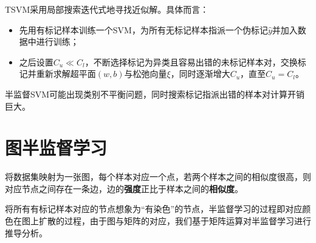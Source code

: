 TSVM采用局部搜索迭代式地寻找近似解。具体而言：
\begin{itemize}
    \item 先用有标记样本训练一个SVM，为所有无标记样本指派一个伪标记$\hat{y}$并加入数据中进行训练；
    \item 之后设置$C_u \ll C_l$，不断选择标记为异类且容易出错的未标记样本对，交换标记并重新求解超平面$(w,b)$与松弛向量$\xi$，同时逐渐增大$C_u$，直至$C_u = C_l$。
\end{itemize}

半监督SVM可能出现类别不平衡问题，同时搜索标记指派出错的样本对计算开销巨大。

\section{图半监督学习}\label{sec:12.4}
将数据集映射为一张图，每个样本对应一个点，若两个样本之间的相似度很高，则对应节点之间存在一条边，边的\textbf{强度}正比于样本之间的\textbf{相似度}。

将所有有标记样本对应的节点想象为“有染色”的节点，半监督学习的过程即对应颜色在图上扩散的过程，由于图与矩阵的对应，我们基于矩阵运算对半监督学习进行推导分析。

